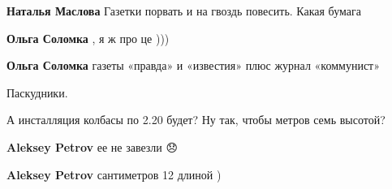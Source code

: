 \begin{itemize}
\begin{itemize}
\textbf{Наталья Маслова} Газетки порвать и на гвоздь повесить. Какая бумага

 
\textbf{Ольга Соломка} , я ж про це )))

 
\textbf{Ольга Соломка} газеты «правда» и «известия» плюс журнал «коммунист» 🤮
\end{itemize}

 
Паскудники.

 

А инсталляция колбасы по 2.20 будет? Ну так, чтобы метров семь высотой?

\begin{itemize}
 
\textbf{Aleksey Petrov} ее не завезли 😞

 
\textbf{Aleksey Petrov} сантиметров 12 длиной )

 

\end{itemize}
\end{itemize}
